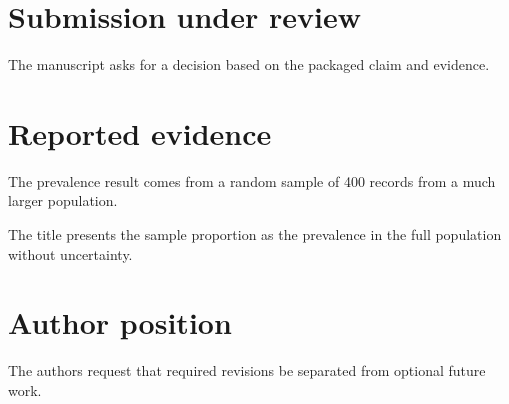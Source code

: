 \documentclass{article}
\begin{document}
\section{Submission under review}
The manuscript asks for a decision based on the packaged claim and evidence.
\section{Reported evidence}
The prevalence result comes from a random sample of 400 records from a much larger population.

The title presents the sample proportion as the prevalence in the full population without uncertainty.
\section{Author position}
The authors request that required revisions be separated from optional future work.
\end{document}
